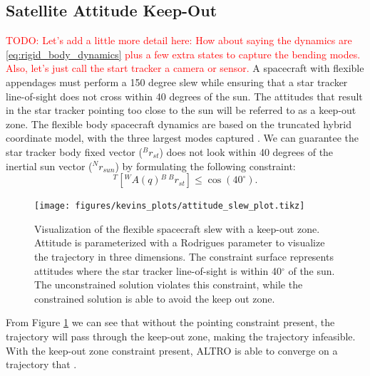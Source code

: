 \documentclass[letterpaper, 10 pt, conference]{ieeeconf}  %
\newcommand{\todo}[1]{\textcolor{red}{TODO: #1}}
\begin{document}
    \subsection{Satellite Attitude Keep-Out}
    \todo{Let's add a little more detail here: How about saying the dynamics are \eqref{eq:rigid_body_dynamics} plus a few extra states to capture the bending modes. Also, let's just call the start tracker a camera or sensor.}
    A spacecraft with flexible appendages must perform a 150 degree slew while ensuring
    that a star tracker line-of-sight does not cross within 40 degrees of the sun. The
    attitudes that result in the star tracker pointing too close to the sun will be
    referred to as a keep-out zone. The flexible body spacecraft dynamics are based on
    the truncated hybrid coordinate model, with the three largest modes captured
    \cite{Tracy2020}. We can guarantee the star tracker body fixed vector ($^Br_{st}$)
    does not look within 40 degrees of the inertial sun vector ($^Nr_{sun}$) by
    formulating the following constraint:
    \begin{equation}
         [{}^W r_{sun}]^T[{}^W A(q) {}^B\, {}^Br_{st} ] \leq \cos(40 ^\circ).
    \end{equation}
        \begin{figure}
            \centering
            \texttt{[image: figures/kevins\_plots/attitude\_slew\_plot.tikz]}
            \caption{Visualization of the flexible spacecraft slew with a keep-out zone. Attitude is parameterized with a Rodrigues parameter to visualize the trajectory in three dimensions. The constraint surface represents attitudes where the star tracker line-of-sight is within 40$^\circ$ of the sun. The unconstrained solution violates this constraint, while the constrained solution is able to avoid the keep out zone.}
            \label{fig:keepout}
        \end{figure}
From Figure \ref{fig:keepout} we can see that without the pointing constraint present, the trajectory will pass through the keep-out zone, making the trajectory infeasible. With the keep-out zone constraint present, ALTRO is able to converge on a trajectory that . 
\end{document}
